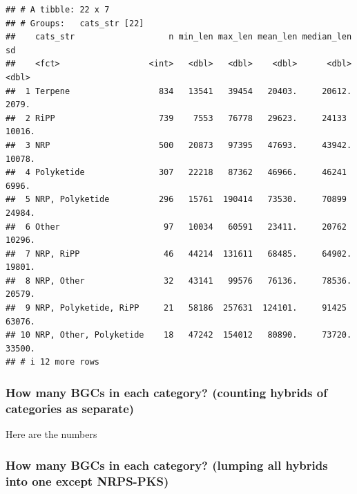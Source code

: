\documentclass[
]{article}
\begin{document}
\begin{verbatim}
## # A tibble: 22 x 7
## # Groups:   cats_str [22]
##    cats_str                   n min_len max_len mean_len median_len     sd
##    <fct>                  <int>   <dbl>   <dbl>    <dbl>      <dbl>  <dbl>
##  1 Terpene                  834   13541   39454   20403.     20612.  2079.
##  2 RiPP                     739    7553   76778   29623.     24133  10016.
##  3 NRP                      500   20873   97395   47693.     43942. 10078.
##  4 Polyketide               307   22218   87362   46966.     46241   6996.
##  5 NRP, Polyketide          296   15761  190414   73530.     70899  24984.
##  6 Other                     97   10034   60591   23411.     20762  10296.
##  7 NRP, RiPP                 46   44214  131611   68485.     64902. 19801.
##  8 NRP, Other                32   43141   99576   76136.     78536. 20579.
##  9 NRP, Polyketide, RiPP     21   58186  257631  124101.     91425  63076.
## 10 NRP, Other, Polyketide    18   47242  154012   80890.     73720. 33500.
## # i 12 more rows
\end{verbatim}

\subsubsection{How many BGCs in each category? (counting hybrids of
categories as
separate)}\label{how-many-bgcs-in-each-category-counting-hybrids-of-categories-as-separate}

Here are the numbers

\subsubsection{How many BGCs in each category? (lumping all hybrids into
one except
NRPS-PKS)}\label{how-many-bgcs-in-each-category-lumping-all-hybrids-into-one-except-nrps-pks}
\end{document}
